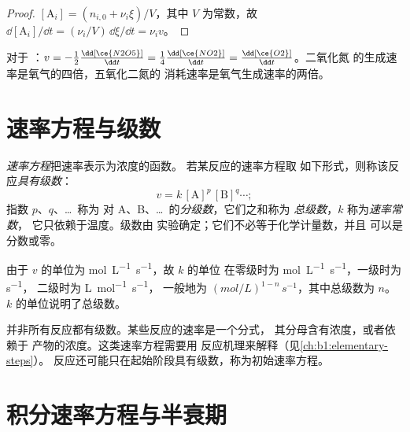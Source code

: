 \begin{proof}
$[\mathrm{A}_i] = (n_{i,0} + \nu_i\xi)/V$，其中 $V$ 为常数，故
$\dd[\mathrm{A}_i]/\dd t = (\nu_i/V)\,\dd\xi/\dd t = \nu_i v$。
\end{proof}

\begin{example}[五氧化二氮的分解]\label{ex:b1:rate-laws:n2o5}
对于 ：$v = -\frac12\frac{\dd[\ce{N2O5}]}{\dd t} =
\frac14\frac{\dd[\ce{NO2}]}{\dd t} = \frac{\dd[\ce{O2}]}{\dd t}$。二氧化氮
的生成速率是氧气的四倍，五氧化二氮的
消耗速率是氧气生成速率的两倍。
\end{example}

\section{速率方程与级数}

\begin{definition}\label{def:b1:rate-laws:order}
\emph{速率方程}把速率表示为浓度的函数。
若某反应的速率方程取
如下形式，则称该反应\emph{具有级数}：
\[
  v = k\,[\mathrm{A}]^{p}\,[\mathrm{B}]^{q} \cdots ;
\]
指数 $p$、$q$、\dots\ 称为
对 A、B、\dots\ 的\emph{分级数}，它们之和称为
\emph{总级数}，$k$ 称为\emph{速率常数}，
它只依赖于温度。级数由
实验确定；它们不必等于化学计量数，并且
可以是分数或零。
\end{definition}

\begin{remark}[$k$ 的单位]\label{rem:b1:rate-laws:units}
由于 $v$ 的单位为 \unit{mol.L^{-1}.s^{-1}}，故 $k$ 的单位
在零级时为 \unit{mol.L^{-1}.s^{-1}}，一级时为 \unit{s^{-1}}，
二级时为 \unit{L.mol^{-1}.s^{-1}}，
一般地为 $(\unit{mol/L})^{1-n}\,\unit{s^{-1}}$，其中总级数为 $n$。
$k$ 的单位说明了总级数。
\end{remark}

\begin{remark}[无级数的反应]\label{rem:b1:rate-laws:no-order}
并非所有反应都有级数。某些反应的速率是一个分式，
其分母含有浓度，或者依赖于
产物的浓度。这类速率方程需要用
反应机理来解释（见\cref{ch:b1:elementary-steps}）。
反应还可能只在起始阶段具有级数，称为初始速率方程。
\end{remark}

\section{积分速率方程与半衰期}

